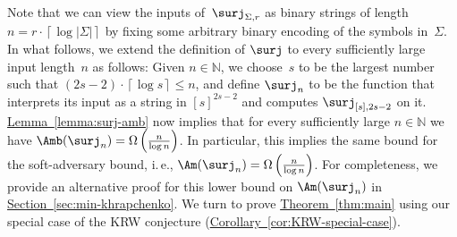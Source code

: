 \documentclass[11pt]{article}
\numberwithin{equation}{section}
\theoremstyle{definition}
\theoremstyle{plain}
\newcommand{\N}{\mathbb N}
\newcommand{\ie}{i.\,e.}
\newcommand{\expref}[2]{\hyperref[#2]{#1~\ref{#2}}}
\theoremstyle{definition}\newtheorem{notation}[theorem]{Notation}\theoremstyle{plain}
\begin{document}
Note that we can view the inputs of~$\surj_{\Sigma,r}$ as binary
strings of length~$n=r\cdot\left\lceil \log\left|\Sigma\right|\right\rceil $
by fixing some arbitrary binary encoding of the symbols in~$\Sigma$.
In what follows, we extend the definition of $\surj$ to every sufficiently
large input length~$n$ as follows: Given $n\in\N$, we choose~$s$
to be the largest number such that $(2s-2)\cdot\left\lceil \log s\right\rceil \le n$,
and define $\surj_{n}$ to be the function that interprets its input
as a string in $\left[s\right]^{2s-2}$ and computes $\surj_{\left[s\right],2s-2}$
on it. \expref{Lemma}{lemma:surj-amb} now implies that for every sufficiently large
$n\in\N$ we have $\Amb(\surj_{n})=\Omega\left(\frac{n}{\log n}\right)$.
In particular, this implies the same bound for the soft-adversary
bound, \ie, $\Am(\surj_{n})=\Omega\left(\frac{n}{\log n}\right)$.
For completeness, we provide an alternative proof for this lower bound
on $\Am(\surj_{n})$ in \expref{Section}{sec:min-khrapchenko}. We turn to prove
\expref{Theorem}{thm:main} using our special case of the KRW conjecture 
(\expref{Corollary}{cor:KRW-special-case}). 
\end{document}
